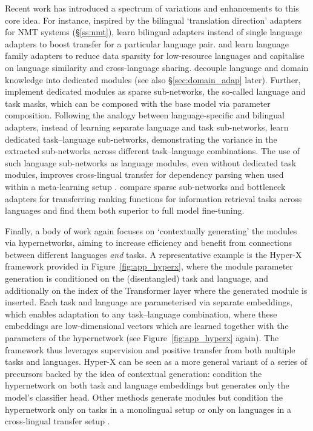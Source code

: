 Recent work has introduced a spectrum of variations and enhancements to this core idea. For instance, inspired by the bilingual `translation direction' adapters for NMT systems (\S\ref{ss:nmt}), \cite{Parovic2022BADX} learn bilingual adapters instead of single language adapters to boost transfer for a particular language pair. \cite{Faisal:2022arxiv} and \cite{Chronopolou:2022arxiv} learn language family adapters to reduce data sparsity for low-resource languages and capitalise on language similarity and cross-language sharing. \cite{Stickland2021MultilingualDomainAdapt} decouple language and domain knowledge into dedicated modules (see also \S\ref{sec:domain_adap} later). %
Further, \cite{ansell2021composable} implement dedicated modules as sparse sub-networks, the so-called language and task masks, which can be composed with the base model via parameter composition. Following the analogy between language-specific and bilingual adapters, instead of learning separate language and task sub-networks, \cite{Foroutan2022Discovering} learn dedicated task--language sub-networks, demonstrating the variance in the extracted sub-networks across different task--language combinations. The use of such language sub-networks as language modules, even without dedicated task modules, improves cross-lingual transfer for dependency parsing when used within a meta-learning setup \citep{Choenni:2022arxiv}. \citet{litschko-etal-2022-parameter} compare sparse sub-networks and bottleneck adapters for transferring ranking functions for information retrieval tasks across languages and find them both superior to full model fine-tuning.

Finally, a body of work again focuses on `contextually generating' the modules via hypernetworks, aiming to increase efficiency and benefit from connections between different languages \textit{and} tasks. A representative example is the Hyper-X framework \citep{Ustun:2022hyperx} provided in Figure~\ref{fig:app_hyperx}, where the module parameter generation is conditioned on the (disentangled) task and language, and additionally on the index of the Transformer layer where the generated module is inserted. Each task and language are parameterised via separate embeddings, which enables adaptation to any task--language combination, where these embeddings are low-dimensional vectors which are learned together with the parameters of the hypernetwork (see Figure~\ref{fig:app_hyperx} again). The framework thus leverages supervision and positive transfer from both multiple tasks and languages. Hyper-X can be seen as a more general variant of a series of precursors backed by the idea of contextual generation: \citet{ponti-etal-2021-parameter} condition the hypernetwork on both task and language embeddings but generates only the model's classifier head. Other methods generate modules but condition the hypernetwork only on tasks in a monolingual setup \citep{mahabadi2021parameter} or only on languages in a cross-lingual transfer setup \citep{Ustun2020,Ansell2021MADG}.

